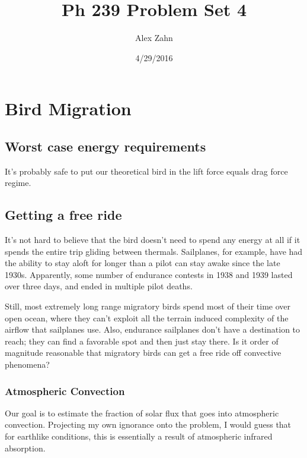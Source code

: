 \documentclass[12pt]{article}
\title{Ph 239 Problem Set 4}
\author{Alex Zahn}
\date{4/29/2016}
\begin{document}
\maketitle

\newcommand{\wmsq}{W/\(\mathrm{m}^2\,\)}
\newcommand{\msq}{\(\mathrm{m}^2\,\)}
\newcommand{\micron}{\(\mu\mathrm{m}\)\,}
\newcommand{\mcb}{\(\mathrm{m}^3\,\)}

\section{Bird Migration}

\subsection{Worst case energy requirements}

It's probably safe to put our theoretical bird in the lift force equals drag force regime. 

\subsection{Getting a free ride}

It's not hard to believe that the bird doesn't need to spend any energy at all if it spends the entire trip gliding between thermals. Sailplanes, for example, have had the ability to stay aloft for longer than a pilot can stay awake since the late 1930s. Apparently, some number of endurance contests in 1938 and 1939 lasted over three days, and ended in multiple pilot deaths.

Still, most extremely long range migratory birds spend most of their time over open ocean, where they can't exploit all the terrain induced complexity of the airflow that sailplanes use. Also, endurance sailplanes don't have a destination to reach; they can find a favorable spot and then just stay there. Is it order of magnitude reasonable that migratory birds can get a free ride off convective phenomena?

\subsubsection{Atmospheric Convection}

Our goal is to estimate the fraction of solar flux that goes into atmospheric convection. Projecting my own ignorance onto the problem, I would guess that for earthlike conditions, this is essentially a result of atmospheric infrared absorption.
\end{document}
